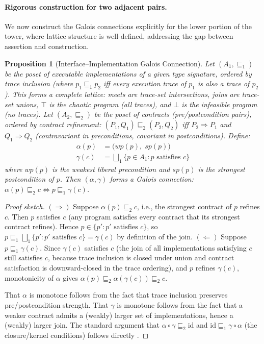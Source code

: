 \documentclass[11pt, a4paper]{googledeepmind}
\newtheorem{proposition}{Proposition}[section]
\begin{document}
\paragraph{Rigorous construction for two adjacent pairs.}
We now construct the Galois connections explicitly for the lower portion of the tower, where lattice structure is well-defined, addressing the gap between assertion and construction.

\begin{proposition}[Interface--Implementation Galois Connection]
\label{prop:galois-impl}
Let $(A_1, \sqsubseteq_1)$ be the poset of executable implementations of a given type signature, ordered by trace inclusion (where $p_1 \sqsubseteq_1 p_2$ iff every execution trace of $p_1$ is also a trace of $p_2$). This forms a complete lattice: meets are trace-set intersections, joins are trace-set unions, $\top$ is the chaotic program (all traces), and $\bot$ is the infeasible program (no traces). Let $(A_2, \sqsubseteq_2)$ be the poset of contracts (pre/postcondition pairs), ordered by contract refinement: $(P_1, Q_1) \sqsubseteq_2 (P_2, Q_2)$ iff $P_2 \Rightarrow P_1$ and $Q_1 \Rightarrow Q_2$ (contravariant in preconditions, covariant in postconditions). Define:
\begin{align}
    \alpha(p) &= \bigl(\mathit{wp}(p),\; \mathit{sp}(p)\bigr) \label{eq:galois-alpha}\\
    \gamma(c) &= \bigsqcup\nolimits_1 \{p \in A_1 : p \text{ satisfies } c\} \label{eq:galois-gamma}
\end{align}
where $\mathit{wp}(p)$ is the weakest liberal precondition and $\mathit{sp}(p)$ is the strongest postcondition of $p$. Then $(\alpha, \gamma)$ forms a Galois connection: $\alpha(p) \sqsubseteq_2 c \iff p \sqsubseteq_1 \gamma(c)$.
\end{proposition}

\begin{proof}[Proof sketch]
$(\Rightarrow)$\; Suppose $\alpha(p) \sqsubseteq_2 c$, i.e., the strongest contract of $p$ refines $c$. Then $p$ satisfies $c$ (any program satisfies every contract that its strongest contract refines). Hence $p \in \{p' : p' \text{ satisfies } c\}$, so $p \sqsubseteq_1 \bigsqcup_1\{p' : p' \text{ satisfies } c\} = \gamma(c)$ by definition of the join.
$(\Leftarrow)$\; Suppose $p \sqsubseteq_1 \gamma(c)$. Since $\gamma(c)$ satisfies $c$ (the join of all implementations satisfying $c$ still satisfies $c$, because trace inclusion is closed under union and contract satisfaction is downward-closed in the trace ordering), and $p$ refines $\gamma(c)$, monotonicity of $\alpha$ gives $\alpha(p) \sqsubseteq_2 \alpha(\gamma(c)) \sqsubseteq_2 c$.

That $\alpha$ is monotone follows from the fact that trace inclusion preserves pre/postcondition strength. That $\gamma$ is monotone follows from the fact that a weaker contract admits a (weakly) larger set of implementations, hence a (weakly) larger join. The standard argument that $\alpha \circ \gamma \sqsubseteq_2 \mathrm{id}$ and $\mathrm{id} \sqsubseteq_1 \gamma \circ \alpha$ (the closure/kernel conditions) follows directly \citep{cousot1977abstract, back1980correctness}.
\end{proof}
\end{document}
